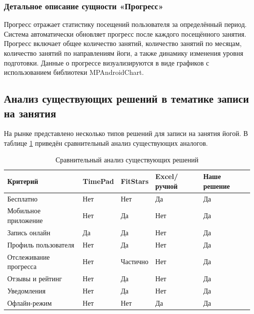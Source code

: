 \subsubsection{Детальное описание сущности «Прогресс»}

Прогресс отражает статистику посещений пользователя за определённый период. Система автоматически обновляет прогресс после каждого посещённого занятия. Прогресс включает общее количество занятий, количество занятий по месяцам, количество занятий по направлениям йоги, а также динамику изменения уровня подготовки. Данные о прогрессе визуализируются в виде графиков с использованием библиотеки MPAndroidChart.

\subsection{Анализ существующих решений в тематике записи на занятия}

На рынке представлено несколько типов решений для записи на занятия йогой. В таблице \ref{tab:comparison} приведён сравнительный анализ существующих аналогов.

\vspace{1em}
\renewcommand{\arraystretch}{1.4}
\begin{table}[H]
	\centering
	\caption{Сравнительный анализ существующих решений}
	\label{tab:comparison}
	\normalsize
	\setlength{\tabcolsep}{6pt}
	\begin{tabular}{|m{4.5cm}|m{2.2cm}|m{2.2cm}|m{2.9cm}|m{2.8cm}|}
		\hline
		Критерий & TimePad & FitStars & Excel/ручной & Наше решение \\
		\hline
		Бесплатно & Нет & Нет & Да & Да \\
		\hline
		Мобильное приложение & Нет & Да & Нет & Да \\
		\hline
		Запись онлайн & Да & Да & Нет & Да \\
		\hline
		Профиль пользователя & Нет & Да & Нет & Да \\
		\hline
		Отслеживание прогресса & Нет & Частично & Нет & Да \\
		\hline
		Отзывы и рейтинг & Нет & Да & Нет & Да \\
		\hline
		Уведомления & Нет & Да & Нет & Да \\
		\hline
		Офлайн-режим & Нет & Нет & Да & Да \\
		\hline
	\end{tabular}
\end{table}
\renewcommand{\arraystretch}{1}


